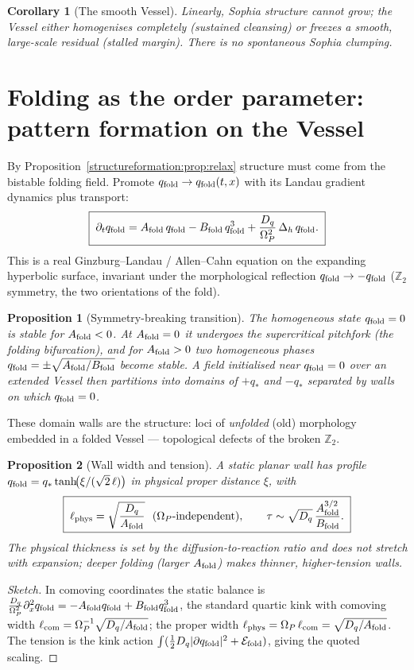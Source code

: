 \documentclass[11pt,a4paper,oneside]{book}
\newcommand{\Op}{\Omega_P}
\newcommand{\qf}{q_{\rm fold}}
\newcommand{\Af}{A_{\rm fold}}
\newcommand{\Bf}{B_{\rm fold}}
\newcommand{\laph}{\Delta_h}
\theoremstyle{plain}
\newtheorem{proposition}{Proposition}[chapter]
\newtheorem{corollary}{Corollary}[chapter]
\theoremstyle{definition}
\theoremstyle{remark}
\begin{document}
\begin{corollary}[The smooth Vessel]
Linearly, Sophia structure cannot grow; the Vessel either homogenises completely (sustained cleansing)
or freezes a smooth, large-scale residual (stalled margin). There is no spontaneous Sophia clumping.
\end{corollary}

\section{Folding as the order parameter: pattern formation on the Vessel}

By Proposition~\ref{structureformation:prop:relax} structure must come from the bistable folding field. Promote
$\qf\to\qf(t,x)$ with its Landau gradient dynamics plus transport:
\begin{equation}
\boxed{\;\partial_t\qf=\Af\,\qf-\Bf\,\qf^{3}+\frac{D_q}{\Op^2}\,\laph\,\qf.\;}
\end{equation}
This is a real Ginzburg--Landau / Allen--Cahn equation on the expanding hyperbolic surface, invariant
under the morphological reflection $\qf\to-\qf$ ($\mathbb Z_2$ symmetry, the two orientations of the
fold).

\begin{proposition}[Symmetry-breaking transition]\label{structureformation:prop:break}
The homogeneous state $\qf=0$ is stable for $\Af<0$. At $\Af=0$ it undergoes the supercritical pitchfork
(the folding bifurcation), and for $\Af>0$ two homogeneous phases $\qf=\pm\sqrt{\Af/\Bf}$ become stable.
A field initialised near $\qf=0$ over an extended Vessel then partitions into domains of $+q_\ast$ and
$-q_\ast$ separated by walls on which $\qf=0$.
\end{proposition}

These domain walls are the structure: loci of \emph{unfolded} (old) morphology embedded in a folded
Vessel --- topological defects of the broken $\mathbb Z_2$.

\begin{proposition}[Wall width and tension]\label{structureformation:prop:wall}
A static planar wall has profile $\qf=q_\ast\tanh\!\bigl(\xi/(\sqrt2\,\ell)\bigr)$ in physical proper
distance $\xi$, with
\begin{equation}
\boxed{\;\ell_{\rm phys}=\sqrt{\frac{D_q}{\Af}}\ \ (\Op\text{-independent}),
\qquad
\tau\sim\sqrt{D_q}\,\frac{\Af^{3/2}}{\Bf}.\;}
\end{equation}
The physical thickness is set by the diffusion-to-reaction ratio and does not stretch with expansion;
deeper folding (larger $\Af$) makes thinner, higher-tension walls.
\end{proposition}
\begin{proof}[Sketch]
In comoving coordinates the static balance is
$\tfrac{D_q}{\Op^2}\partial_x^2\qf=-\Af\qf+\Bf\qf^3$, the standard quartic kink with comoving width
$\ell_{\rm com}=\Op^{-1}\sqrt{D_q/\Af}$; the proper width $\ell_{\rm phys}=\Op\,\ell_{\rm com}=\sqrt{D_q/\Af}$.
The tension is the kink action $\int(\tfrac12 D_q|\partial\qf|^2+\mathcal E_{\rm fold})$, giving the
quoted scaling.
\end{proof}
\end{document}

